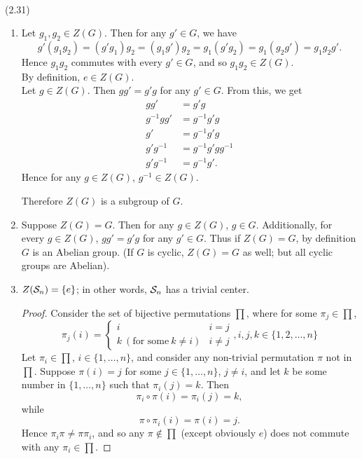 \documentclass{homework}
\begin{document}
\begin{solution}\\

  (2.31)
  \begin{enumerate}[label=(\alph*)]
    \item Let $g_1,g_2\in Z(G)$. Then for any $g'\in G$, we have \[
        g'(g_1g_2)=(g'g_1)g_2=(g_1g')g_2=g_1(g'g_2)=g_1(g_2g')=g_1g_2g'
      .\] Hence $ g_1g_2$ commutes with every $g'\in G$, and so $g_1g_2\in Z(G)$.\\
      By definition, $e\in Z(G)$.\\
      Let $g\in Z(G)$. Then $gg'=g'g$ for any $g'\in G$. From this, we get
      \begin{align*}
        gg'&= g'g \\
        g^{-1}gg'&=g^{-1}g'g\\
        g'&= g^{-1}g'g \\
        g'g^{-1}&= g^{-1}g'gg^{-1} \\
        g'g^{-1}&=g^{-1}g'
      .\end{align*} Hence for any $g\in Z(G)$, $g^{-1}\in Z(G)$.

      Therefore $Z(G)$ is a subgroup of $G$.
    \item Suppose $Z(G)=G$. Then for any $g\in Z(G)$, $g\in G$. Additionally, for every $g\in Z(G)$,
      $gg'=g'g$ for any $g'\in G$. Thus if $Z(G)=G$, by definition $G$ is an Abelian group. (If $G$ 
      is cyclic, $Z(G)=G$ as well; but all cyclic groups are Abelian).
    \item $Z(\mathcal{S}_n)=\{ e \}$; in other words, $\mathcal{S}_n$ has a trivial center.
      \begin{proof}[Proof]
        Consider the set of bijective permutations $\prod$, where for some $\pi_j\in \prod$, \[
          \pi_j(i)=\left\{ \begin{array}{lr} i&i=j\\k~(\text{for some}~k\neq i)&i\neq
          j\end{array}, i,j,k\in \{ 1,2,\ldots,n \}\right.
            \] Let $\pi_i \in \prod$, $i\in \{ 1,\ldots,n \}$, and consider any non-trivial
            permutation $\pi$ not in $\prod$. Suppose $\pi(i)=j$ for some $j\in \{ 1,\ldots,n \}$,
            $j\neq i$, and let $k$ be some number in $\{ 1,\ldots,n \}$ such that $\pi_i(j)=k$. Then
            \[
              \pi_i\circ \pi(i) = \pi_i(j) = k
            ,\] while \[
              \pi\circ \pi_i(i) = \pi(i)=j
            .\] Hence $\pi_i\pi\neq \pi\pi_i$, and so any $\pi\not\in \prod$ (except obviously
            $e$) does not commute with any $\pi_i\in \prod$.


\end{proof}
\end{enumerate}
\end{solution}
\end{document}
